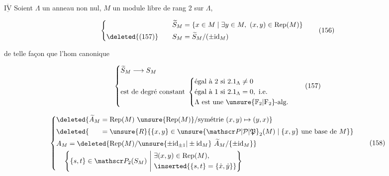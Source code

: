 
$\underline{\overline{\mathrm{IV}}}$ Soient  $\Lambda$ un anneau non nul, $M$ un module libre de rang 2 sur $\Lambda$,

\[
 \left\{\begin{aligned}
 \widetilde S_M&=\{x\in M\mid\exists y\in M,\ (x,y)\in\operatorname{Rep}(M)\}\\
 \deleted{\text{(157)}}\qquad S_M&=\widetilde S_M/(\pm\mathrm{id}_M)
 \end{aligned}\right.
 \tag*{(156)}
\]

de telle façon que l'hom canonique

\[
 \left\{\begin{aligned}
 &\widetilde S_M\longrightarrow S_M\\
 &\text{est de degré constant }\left\{\begin{aligned}
 &\text{égal à }2\text{ si }2.1_\Lambda\ne0\\
 &\text{égal à }1\text{ si }2.1_\Lambda=0,\ \text{i.e.}\\
 &\Lambda\text{ est une }\unsure{\mathbb F_2|\mathrm F_2}\text{-alg.}
 \end{aligned}\right.
 \end{aligned}\right.
 \tag*{(157)}
\]


\[
 \left\{\begin{aligned}
 &\deleted{\widetilde A_M=\operatorname{Rep}(M)\ \unsure{\operatorname{Rep}(M)}/\text{symétrie }(x,y)\mapsto(y,x)}\\
 &\deleted{\phantom{\widetilde A_M}=\unsure{R}\{\{x,y\}\in\unsure{\mathscr P|\mathcal P|\mathfrak P}_2(M)\mid\{x,y\}\text{ une base de }M\}}\\
 &A_M=\deleted{\operatorname{Rep}(M)/\unsure{\pm\mathrm{id}_{\pm1}|\pm\mathrm{id}_M}\ \widetilde A_M/\{\pm\mathrm{id}_M\}}\\
 &\quad\left\{\{s,t\}\in\mathscr P_2(S_M)\ \middle|\ 
 \begin{aligned}&\exists(x,y)\in\operatorname{Rep}(M),\\ &\inserted{\{s,t\}=\{\dot x,\dot y\}}\end{aligned}\right\}
 \end{aligned}\right.
 \tag*{(158)}
\]


